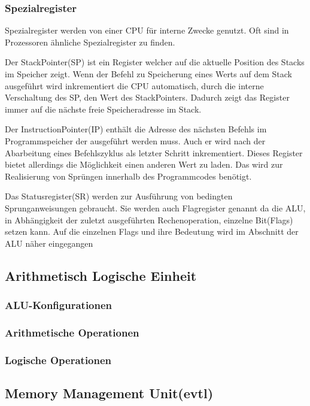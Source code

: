 \documentclass[12pt]{article}
\begin{document}
\subsubsection{Spezialregister}
Spezialregister werden von einer CPU für interne Zwecke genutzt. Oft sind in Prozessoren ähnliche Spezialregister zu finden. 

Der StackPointer(SP) ist ein Register welcher auf die aktuelle Position des Stacks im Speicher zeigt. Wenn der Befehl zu Speicherung eines Werts auf dem Stack ausgeführt wird inkrementiert die CPU automatisch, durch die interne Verschaltung des SP, den Wert des StackPointers. Dadurch zeigt das Register immer auf die nächste freie Speicheradresse im Stack.

Der InstructionPointer(IP) enthält die Adresse des nächsten Befehls im Programmspeicher der ausgeführt werden muss. Auch er wird nach der Abarbeitung eines Befehlszyklus als letzter Schritt inkrementiert. Dieses Register bietet allerdings die Möglichkeit einen anderen Wert zu laden. Das wird zur Realisierung von Sprüngen innerhalb des Programmcodes benötigt. 

Das Statusregister(SR) werden zur Ausführung von bedingten Sprunganweisungen gebraucht. Sie werden auch Flagregister genannt da die ALU, in Abhängigkeit der zuletzt ausgeführten Rechenoperation, einzelne Bit(Flags) setzen kann. Auf die einzelnen Flags und ihre Bedeutung wird im Abschnitt der ALU näher eingegangen
\subsection{Arithmetisch Logische Einheit}
\subsubsection{ALU-Konfigurationen}
\subsubsection{Arithmetische Operationen}
\subsubsection{Logische Operationen}
\subsection{Memory Management Unit(evtl)}
\end{document}
